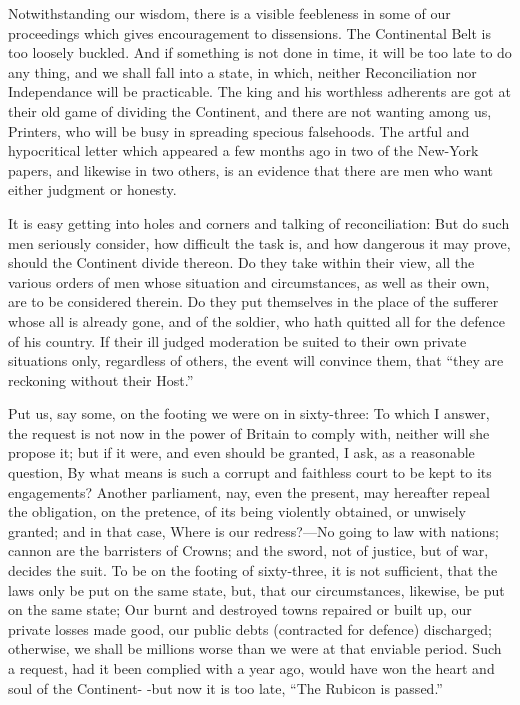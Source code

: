 \documentclass[12pt,oneside]{memoir}
\begin{document}
Notwithstanding our wisdom, there is a visible feebleness in some of
our proceedings which gives encouragement to dissensions. The
Continental Belt is too loosely buckled. And if something is not
done in time, it will be too late to do any thing, and we shall fall
into a state, in which, neither Reconciliation nor Independance will
be practicable. The king and his worthless adherents are got at
their old game of dividing the Continent, and there are not wanting
among us, Printers, who will be busy in spreading specious
falsehoods. The artful and hypocritical letter which appeared a few
months ago in two of the New-York papers, and likewise in two others,
is an evidence that there are men who want either judgment or
honesty.

It is easy getting into holes and corners and talking of
reconciliation: But do such men seriously consider, how difficult
the task is, and how dangerous it may prove, should the Continent
divide thereon. Do they take within their view, all the various
orders of men whose situation and circumstances, as well as their
own, are to be considered therein. Do they put themselves in the
place of the sufferer whose all is already gone, and of the soldier,
who hath quitted all for the defence of his country. If their ill
judged moderation be suited to their own private situations only,
regardless of others, the event will convince them, that ``they are
reckoning without their Host.''

Put us, say some, on the footing we were on in sixty-three: To which
I answer, the request is not now in the power of Britain to comply
with, neither will she propose it; but if it were, and even should
be granted, I ask, as a reasonable question, By what means is such a
corrupt and faithless court to be kept to its engagements? Another
parliament, nay, even the present, may hereafter repeal the
obligation, on the pretence, of its being violently obtained, or
unwisely granted; and in that case, Where is our redress?---No going
to law with nations; cannon are the barristers of Crowns; and the
sword, not of justice, but of war, decides the suit. To be on the
footing of sixty-three, it is not sufficient, that the laws only be
put on the same state, but, that our circumstances, likewise, be put
on the same state; Our burnt and destroyed towns repaired or built
up, our private losses made good, our public debts (contracted for
defence) discharged; otherwise, we shall be millions worse than we
were at that enviable period. Such a request, had it been complied
with a year ago, would have won the heart and soul of the Continent-
-but now it is too late, ``The Rubicon is passed.''
\end{document}
